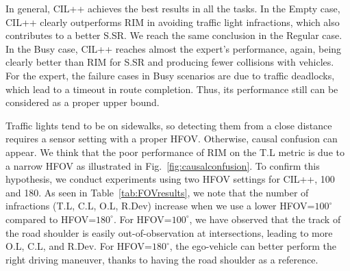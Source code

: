 In general, CIL++ achieves the best results in all the tasks. 
In the Empty case, CIL++ clearly outperforms RIM in avoiding traffic light infractions, which also contributes to a better S.SR. We reach the same conclusion in the Regular case. 
In the Busy case, CIL++ reaches almost the expert's performance, again, being clearly better than RIM for S.SR and producing fewer collisions with vehicles. 
For the expert, the failure cases in Busy scenarios are due to traffic deadlocks, which lead to a timeout in route completion. 
Thus, its performance still can be considered as a proper upper bound. 


Traffic lights tend to be on sidewalks, so detecting them from a close distance requires a sensor setting with a proper HFOV. 
Otherwise, causal confusion can appear. 
We think that the poor performance of RIM on the T.L metric is due to a narrow HFOV as illustrated in Fig.~\ref{fig:causalconfusion}.  
To confirm this hypothesis, we conduct experiments using two HFOV settings for CIL++, 100 and 180. 
As seen in Table~\ref{tab:FOVresults}, we note that the number of infractions (T.L, C.L, O.L, R.Dev) increase when we use a lower HFOV=$100^\circ$ compared to HFOV=$180^\circ$. 
For HFOV=$100^\circ$, we have observed that the track of the road shoulder is easily out-of-observation at intersections, leading to more O.L, C.L, and R.Dev. 
For HFOV=$180^{\circ}$, the ego-vehicle can better perform the right driving maneuver, thanks to having the road shoulder as a reference.


